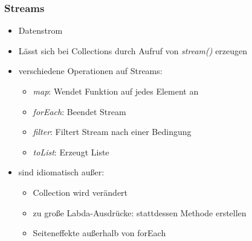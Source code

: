\begin{frame}[fragile]
\frametitle{Streams}
\begin{itemize}
    \item Datenstrom
    \item Lässt sich bei Collections durch Aufruf von \textit{stream()} erzeugen
    \item verschiedene Operationen auf Streams: 
    \begin{itemize}
        \item \textit{map}: Wendet Funktion auf jedes Element an
        \item \textit{forEach}: Beendet Stream
        \item \textit{filter}: Filtert Stream nach einer Bedingung 
        \item \textit{toList}: Erzeugt Liste
    \end{itemize}
    \item sind idiomatisch außer:
    \begin{itemize}
        \item Collection wird verändert
        \item zu große Labda-Ausdrücke: stattdessen Methode erstellen
        \item Seiteneffekte außerhalb von forEach
    \end{itemize}
\end{itemize}
\end{frame}